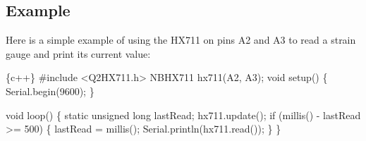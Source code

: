 \subsection*{Example}

Here is a simple example of using the H\+X711 on pins A2 and A3 to read a strain gauge and print it\textquotesingle{}s current value\+:


\begin{DoxyCode}
\{c++\}
#include <Q2HX711.h>
NBHX711 hx711(A2, A3);
void setup() \{
  Serial.begin(9600);
\}

void loop() \{
  static unsigned long lastRead;
  hx711.update();
  if (millis() - lastRead >= 500) \{
    lastRead = millis();
    Serial.println(hx711.read());
  \}
\}
\end{DoxyCode}
 